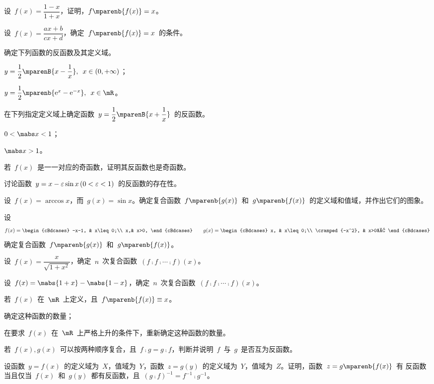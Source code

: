 \begin{exercise}
\item 设~$f(x)=\dfrac{1-x}{1+x}$，证明，$f\mparenb{f(x)}=x$。
\item 设~$f(x)=\dfrac{ax+b}{cx+d}$，确定~$f\mparenb{f(x)}=x$~的条件。
\item 确定下列函数的反函数及其定义域。
\begin{exlistcols}
  \item $\dps y=\frac12\mparenB{x-\frac 1x}\mcond*[\enspace]{x\in(0,+\infty)}$；
  \item $y=\dfrac12\mparenb{\me^x-\me^{-x}}\mcond*[\enspace]{x\in\mR}$。
\end{exlistcols}
\item 在下列指定定义域上确定函数~$\dps y=\frac12\mparenB{x+\frac1x}$~的反函数。
\begin{exlistcols}
  \item $0<\mabs x<1$；
  \item $\mabs x>1$。
\end{exlistcols}
\item 若~$f(x)$~是一一对应的奇函数，证明其反函数也是奇函数。
\item 讨论函数~$y=x-\e\sin x\mcond{0<\e<1}$~的反函数的存在性。
\item 设~$f(x)=\arccos x$，而~$g(x)=\sin x$。确定复合函数~$f\mparenb{g(x)}$~和~$g\mparenb{f(x)}$~的定义域和值域，并作出它们的图象。
\item 设
\[
  f(x)=\begin{cBdcases}
    -x-1, & x\leq0;\\
    x,& x>0,
  \end{cBdcases}\qquad
  g(x)=\begin{cBdcases}
    x,    & x\leq0;\\
    \cramped{-x^2}, & x>0。
  \end{cBdcases}
\]
确定复合函数~$f\mparenb{g(x)}$~和~$g\mparenb{f(x)}$。
\item 设~$f(x)=\dfrac x{\sqrt{1+x^2}}$，确定~$n$~次复合函数~$(f\comp f\comp\dotsb\comp f)(x)$。
\item 设~$f(x)=\mabs{1+x}-\mabs{1-x}$，确定~$n$~次复合函数~$(f\comp f\comp\dotsb\comp f)(x)$。
\item 若~$f(x)$~在~$\mR$~上定义，且~$f\mparenb{f(x)}\equiv x$。
\begin{exlistcols}
  \item 确定这种函数的数量；
  \item 在要求~$f(x)$~在~$\mR$~上严格上升的条件下，重新确定这种函数的数量。
\end{exlistcols}
\item 若~$f(x),g(x)$~可以按两种顺序复合，且~$f\comp g=g\comp f$，判断并说明~$f$~与~$g$~是否互为反函数。
\item 设函数~$y=f(x)$~的定义域为~$X$，值域为~$Y$，函数~$z=g(y)$~的定义域为~$Y$，值域为~$Z$。证明，函数~$z=g\mparenb{f(x)}$~有
反函数当且仅当~$f(x)$~和~$g(y)$~都有反函数，且~$(g\comp f)^{-1}=f^{-1}\comp g^{-1}$。
\end{exercise}


